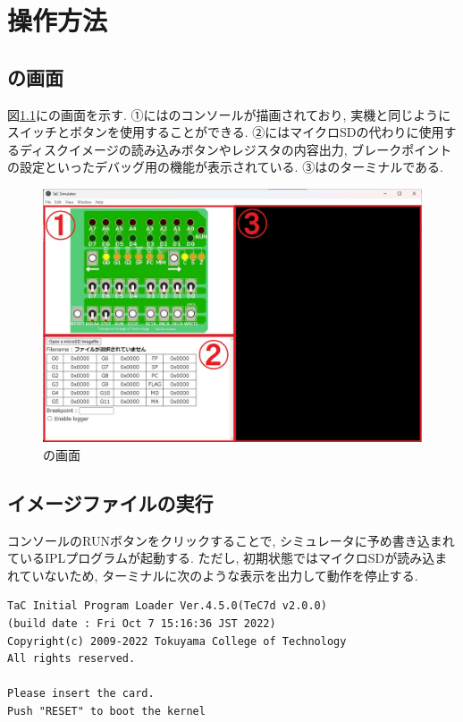 \chapter{操作方法}

\section{\tacsim の画面}

図\ref{fig:ch3-tacsim}に\tacsim の画面を示す. ①には\tac のコンソールが描画されており, 実機と同じようにスイッチとボタンを使用することができる. ②にはマイクロSDの代わりに使用するディスクイメージの読み込みボタンやレジスタの内容出力, ブレークポイントの設定といったデバッグ用の機能が表示されている. ③は\tacsim のターミナルである.

\begin{figure}[H]
    \centering
    \includegraphics[width=12cm]{"figs/chapter3-tacsimulator.jpg"}
    \caption{\tacsim の画面} \label{fig:ch3-tacsim}
\end{figure}

\section{イメージファイルの実行}

コンソールのRUNボタンをクリックすることで, シミュレータに予め書き込まれているIPLプログラムが起動する. ただし, 初期状態ではマイクロSDが読み込まれていないため, ターミナルに次のような表示を出力して動作を停止する.

\begin{mylist}
\begin{verbatim}
TaC Initial Program Loader Ver.4.5.0(TeC7d v2.0.0)
(build date : Fri Oct 7 15:16:36 JST 2022)
Copyright(c) 2009-2022 Tokuyama College of Technology
All rights reserved.

Please insert the card.
Push "RESET" to boot the kernel
\end{verbatim}
\end{mylist}

